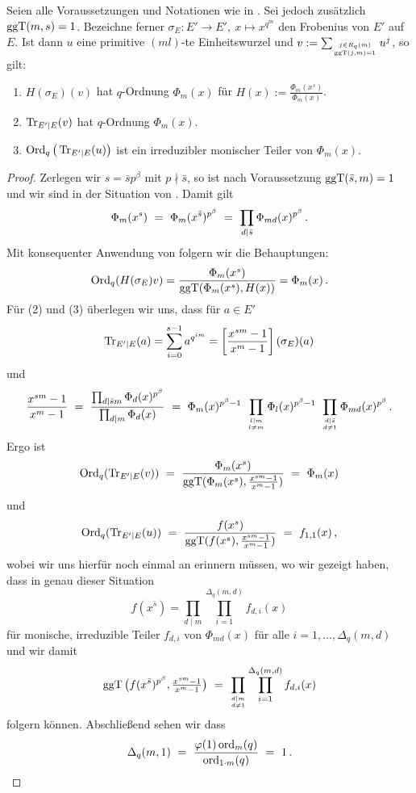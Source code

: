\begin{satz}
  \label{satz:q_ordnung_von_trace}
  Seien alle Voraussetzungen und Notationen wie in 
  .
  Sei jedoch zusätzlich $\operatorname{ggT}(m,s) = 1$.
  Bezeichne ferner 
  $\sigma_E: E'\to E',\ x \mapsto x^{q^m}$ den Frobenius von $E'$ auf $E$.
  Ist dann $u$ eine primitive $(ml)$-te Einheitswurzel
  und $v := \sum_{j\in R_q(m)\atop \operatorname{ggT}(j,m)=1} u^j$, so gilt:
  \begin{enumerate}
    \item $H(\sigma_E)(v)$ hat $q$-Ordnung $\Phi_m(x)$ für 
      $H(x) := \frac{\Phi_m(x^s)}{\Phi_m(x)}$.
    \item $\operatorname{Tr}_{E'\mid E}(v)$ hat $q$-Ordnung $\Phi_m(x)$.
    \item $\operatorname{Ord}_q\big(\operatorname{Tr}_{E'\mid E}(u)\big)$ ist ein irreduzibler 
      monischer Teiler von $\Phi_m(x)$.
  \end{enumerate}
\end{satz}
\begin{proof}
  Zerlegen wir $s = \bar s p^\beta$ mit $p\nmid \bar s$, so ist 
  nach Voraussetzung $\operatorname{ggT}(\bar s, m) = 1$ und wir sind in der Situation von
  . Damit gilt
  \[ \Phi_m(x^s) \ =\  \Phi_m(x^{\bar s})^{p^\beta}
    \ =\  \prod_{d \mid \bar s} \Phi_{md}(x)^{p^\beta}\,.\]
  Mit konsequenter Anwendung von 
  folgern wir die Behauptungen:
  \[ \operatorname{Ord}_q(H(\sigma_E)v) = \frac{\Phi_m(x^s)}{\operatorname{ggT}(\Phi_m(x^s), H(x))}
    = \Phi_m(x)\,.\]
  Für (2) und (3) überlegen wir uns, dass für $a \in E'$
  \[ \operatorname{Tr}_{E'\mid E}(a) = \sum_{i=0}^{s-1} a^{q^{im}} = 
    \left[\frac{x^{sm}-1}{x^m-1}\right](\sigma_E)(a)\]
  und 
  \[ \frac{x^{sm} -1}{x^m-1} \speq= 
    \frac{ \prod_{d\mid \bar sm} \Phi_d(x)^{p^\beta}}{
      \prod_{d\mid m} \Phi_d(x)} \speq=
    \Phi_m(x)^{p^\beta-1}\ 
    \prod_{l\mid m\atop l\neq m} \Phi_l(x)^{p^\beta-1}\ 
    \prod_{d\mid \bar s\atop d\neq 1} \Phi_{md}(x)^{p^\beta} \,.\]
  Ergo ist
  \[ \operatorname{Ord}_q(\operatorname{Tr}_{E'\mid E}(v)) \ =\  
    \frac{\Phi_m(x^s)}{\operatorname{ggT}(\Phi_m(x^s), \frac{x^{sm}-1}{x^m-1})}
    \ =\  \Phi_m(x)\]
  und
  \[ \operatorname{Ord}_q(\operatorname{Tr}_{E'\mid E}(u)) \ =\  
    \frac{f(x^s)}{\operatorname{ggT}(f(x^s), \frac{x^{sm}-1}{x^m-1})} \ =\  f_{1,1}(x) \,,\]
  wobei wir uns hierfür noch einmal an 
  erinnern müssen, wo wir gezeigt haben, dass in genau dieser Situation 
  \[ f(x^{\bar s}) = \prod_{d\mid m} \prod_{i=1}^{\Delta_q(m,d)} f_{d,i}(x) \]
  für monische, irreduzible Teiler $f_{d,i}$ von $\Phi_{md}(x)$ für alle 
  $i=1,\ldots,\Delta_q(m,d)$ und wir damit 
  \[ \operatorname{ggT}\big(f(x^{\bar s})^{p^\beta}, \tfrac{x^{sm}-1}{x^m-1}\big) \ =\ 
    \prod_{d\mid m\atop d \neq 1} \prod_{i=1}^{\Delta_q(m,d)} f_{d,i}(x) \]
  folgern können. Abschließend sehen wir dass
  \[ \Delta_q(m,1) \ =\  \frac{\varphi(1) \operatorname{ord}_m(q)}{\operatorname{ord}_{1\cdot m}(q)}
    \ =\  1\,.\]
\end{proof}


